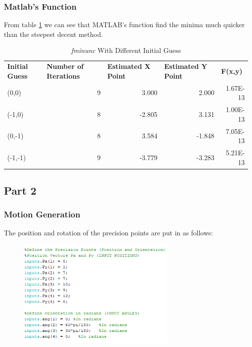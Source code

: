 \documentclass[12pt]{article}
\begin{document}
\subsubsection{Matlab's Function}
From table \ref{tab:fminunc} we can see that MATLAB's function find the minima much quicker than the steepest decent method.
\begin{table}[htbp]
  \centering
  \caption{\textit{fminunc} With Different Initial Guess}
    \begin{tabular}{lrrrr}
    \textbf{Initial Guess} & \multicolumn{1}{l}{\textbf{Number of Iterations}} & \multicolumn{1}{l}{\textbf{Estimated X Point}} & \multicolumn{1}{l}{\textbf{Estimated Y Point}} & \multicolumn{1}{l}{\textbf{F(x,y)}} \\
    (0,0) & 9     & 3.000 & 2.000 & 1.67E-13 \\
    (-1,0) & 8     & -2.805 & 3.131 & 1.00E-13 \\
    (0,-1) & 8     & 3.584 & -1.848 & 7.05E-13 \\
    (-1,-1) & 9     & -3.779 & -3.283 & 5.21E-13 \\
    \end{tabular}%
  \label{tab:fminunc}%
\end{table}%

\subsection{Part 2}
\subsubsection{Motion Generation}
The position and rotation of the precision points are put in as follows:
\begin{figure}[h!]
    \centering
    \includegraphics[width=0.7\textwidth]{MG_5.png}
\end{figure}
\end{document}
